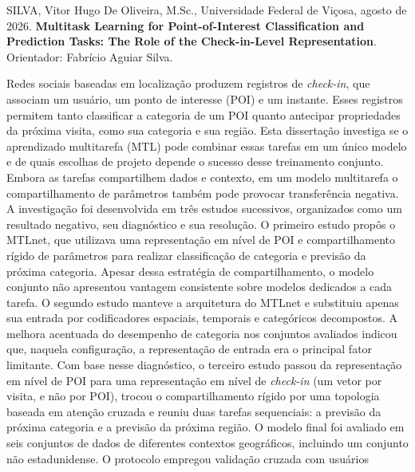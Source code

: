     \begin{resumo}[Resumo]
        \singlespacing
        SILVA, Vitor Hugo De Oliveira, M.Sc., Universidade Federal de Viçosa, agosto de 2026.
        \textbf{Multitask Learning for Point-of-Interest Classification and Prediction Tasks: The Role of the Check-in-Level Representation}. Orientador: Fabrício Aguiar Silva.
        \vspace{\onelineskip}

        \noindent Redes sociais baseadas em localização produzem registros de
        \emph{check-in}, que associam um usuário, um ponto de interesse (POI) e um
        instante. Esses registros permitem tanto classificar a categoria de um POI
        quanto antecipar propriedades da próxima visita, como sua categoria e sua
        região. Esta dissertação investiga se o aprendizado multitarefa (MTL) pode
        combinar essas tarefas em um único modelo e de quais escolhas de projeto
        depende o sucesso desse treinamento conjunto. Embora as tarefas compartilhem
        dados e contexto, em um modelo multitarefa o compartilhamento de parâmetros também pode provocar
        transferência negativa. A investigação foi desenvolvida em três estudos
        sucessivos, organizados como um resultado negativo, seu diagnóstico e sua
        resolução. O primeiro estudo propôs o MTLnet, que utilizava uma representação
        em nível de POI e compartilhamento rígido de parâmetros para realizar
        classificação de categoria e previsão da próxima categoria. Apesar dessa
        estratégia de compartilhamento, o modelo conjunto não apresentou vantagem
        consistente sobre modelos dedicados a cada tarefa. O
        segundo estudo manteve a arquitetura do MTLnet e substituiu apenas sua entrada
        por codificadores espaciais, temporais e categóricos decompostos. A melhora
        acentuada do desempenho de categoria nos conjuntos avaliados indicou que,
        naquela configuração, a representação de entrada era o principal fator
        limitante. Com base nesse diagnóstico, o terceiro estudo passou da
        representação em nível de POI para uma representação em nível de
        \emph{check-in} (um vetor por visita, e não por POI), trocou o
        compartilhamento rígido por uma topologia baseada em atenção cruzada e
        reuniu duas tarefas sequenciais: a previsão da próxima categoria e a
        previsão da próxima região. O modelo final foi avaliado
        em seis conjuntos de dados de diferentes contextos geográficos, incluindo um
        conjunto não estadunidense. O protocolo empregou validação cruzada com usuários

\end{resumo}
